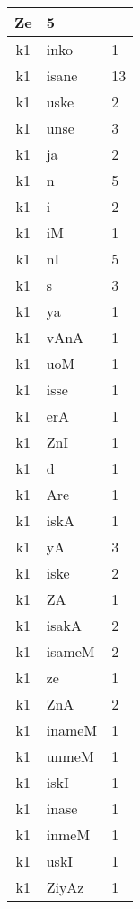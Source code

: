 \documentclass[a4 paper]{article}
\begin{document}
\begin{longtable}{cp{}p{}}
Ze & 5\\ \midrule k1 & inko & 1\\ \midrule k1 & isane & 13\\ \midrule k1 & uske & 2\\ \midrule k1 & unse & 3\\ \midrule k1 & ja & 2\\ \midrule k1 & n & 5\\ \midrule k1 & i & 2\\ \midrule k1 & iM & 1\\ \midrule k1 & nI & 5\\ \midrule k1 & s & 3\\ \midrule k1 & ya & 1\\ \midrule k1 & vAnA & 1\\ \midrule k1 & uoM & 1\\ \midrule k1 & isse & 1\\ \midrule k1 & erA & 1\\ \midrule k1 & ZnI & 1\\ \midrule k1 & d & 1\\ \midrule k1 & Are & 1\\ \midrule k1 & iskA & 1\\ \midrule k1 & yA & 3\\ \midrule k1 & iske & 2\\ \midrule k1 & ZA & 1\\ \midrule k1 & isakA & 2\\ \midrule k1 & isameM & 2\\ \midrule k1 & ze & 1\\ \midrule k1 & ZnA & 2\\ \midrule k1 & inameM & 1\\ \midrule k1 & unmeM & 1\\ \midrule k1 & iskI & 1\\ \midrule k1 & inase & 1\\ \midrule k1 & inmeM & 1\\ \midrule k1 & uskI & 1\\ \midrule k1 & ZiyAz & 1\\ \midrule 

\end{longtable}
\end{document}
